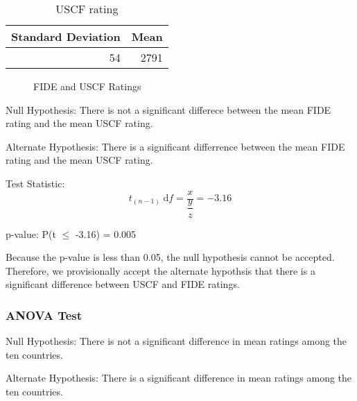 \documentclass[12pt]{article}
\begin{document}
\begin{table}
\begin{center}
\begin{tabular}{rr}
Standard Deviation & Mean\\
\hline
54 & 2791\\
\end{tabular}
    \caption{USCF rating}
\end{center}
\end{table}

\begin{figure}[H]
\centering
{}
\caption{FIDE and USCF Ratings}
\end{figure}

Null Hypothesis: There is not a significant differece between the mean FIDE rating and the mean USCF rating.

Alternate Hypothesis: There is a significant differrence between the mean FIDE rating and the mean USCF rating. 

Test Statistic: 
\begin{equation}
    t_{(n-1)} \; \textrm{d}f = \dfrac{x}{\dfrac{y}{z}} = -3.16
\end{equation}

p-value: P(t \(\leq\) -3.16) = 0.005

Because the p-value is less than 0.05, the null hypothesis cannot be accepted. Therefore, we provisionally accept the alternate hypothsis that there is a significant difference between USCF and FIDE ratings.

\subsubsection{ANOVA Test}
Null Hypothesis: There is not a significant difference in mean ratings among the ten countries. 

Alternate Hypothesis: There is a significant difference in mean ratings among the ten countries. 
\end{document}
